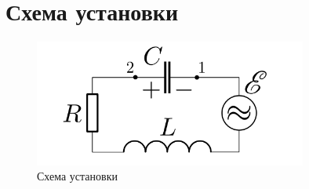 \section{Схема установки}
\begin{figure}[H]
    \centering
    \includegraphics[width=0.8\textwidth]{./img/scheme.png}
    \caption{Схема установки}
\end{figure}
